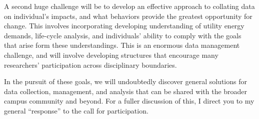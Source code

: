 A second huge challenge will be to develop an effective approach to collating
data on individual's impacts, and what behaviors provide the greatest
opportunity for change. This involves incorporating developing understanding of
utility energy demands, life-cycle analysis, and individuals' ability to comply
with the goals that arise form these understandings. This is an enormous data
management challenge, and will involve developing structures that encourage many
researchers' participation across disciplinary boundaries.

In the pursuit of these goals, we will undoubtedly discover general solutions
for data collection, management, and analysis that can be shared with the
broader campus community and beyond. For a fuller discussion of this, I direct
you to my general “response” to the call for participation.




